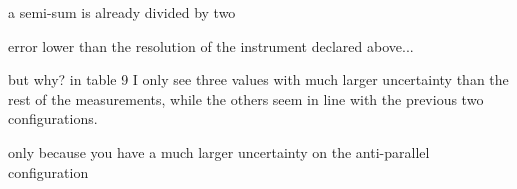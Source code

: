 
a semi-sum is already divided by two

error lower than the resolution of the instrument declared above...


but why? in table 9 I only see three values with much larger uncertainty than the rest of the measurements, while the others seem in line with the previous two configurations.


only because you have a much larger uncertainty on the anti-parallel configuration
